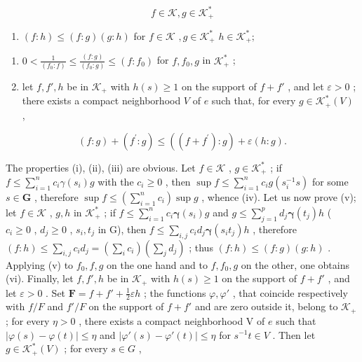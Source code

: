 \[
f \in \mathscr {K}, g \in \mathscr {K} _ {+} ^ {*}
\]

\begin{enumerate}
\def\labelenumi{(\alph{enumi})}
\setcounter{enumi}{21}
\tightlist
\item
  \((f:h)\leqslant (f:g)(g:h)\) for \(f\in \mathcal{K}\) \(,g\in \mathcal{K}_{+}^{*}\) \(h\in \mathcal{K}_{+}^{*};\)
\end{enumerate}

\begin{enumerate}
\def\labelenumi{(\roman{enumi})}
\setcounter{enumi}{5}
\item
  \(0 < \frac{1}{(f_0:f)}\leqslant \frac{(f:g)}{(f_0:g)}\leqslant (f:f_0)\) for \(f,f_0,g\) in \(\mathcal{K}_+^*\) ;
\item
  let \(f, f', h\) be in \(\mathcal{K}_+\) with \(h(s) \geqslant 1\) on the support of \(f + f'\) , and let \(\varepsilon > 0\) ; there exists a compact neighborhood \(V\) of \(e\) such that, for every \(g \in \mathcal{K}_+^*(V)\) ,
\end{enumerate}

\[
(f: g) + (f ^ {\prime}: g) \leqslant ((f + f ^ {\prime}): g) + \varepsilon (h: g).
\]

The properties (i), (ii), (iii) are obvious. Let \(f \in \mathcal{K}\) , \(g \in \mathcal{K}_+^*\) ; if \(f \leqslant \sum_{i=1}^{n} c_i \gamma(s_i)g\) with the \(c_i \geqslant 0\) , then \(\sup f \leqslant \sum_{i=1}^{n} c_i g(s_i^{-1}s)\) for some \(s \in \mathbf{G}\) , therefore \(\sup f \leqslant \left( \sum_{i=1}^{n} c_i \right) \sup g\) , whence (iv). Let us now prove (v); let \(f \in \mathcal{K}\) , \(g, h\) in \(\mathcal{K}_+^*\) ; if \(f \leqslant \sum_{i=1}^{n} c_i \boldsymbol{\gamma}(s_i) g\) and \(g \leqslant \sum_{j=1}^{p} d_j \boldsymbol{\gamma}(t_j) h\) ( \(c_i \geqslant 0\) , \(d_j \geqslant 0\) , \(s_i, t_j\) in G), then \(f \leqslant \sum_{i,j} c_i d_j \boldsymbol{\gamma}(s_i t_j) h\) , therefore \((f: h) \leqslant \sum_{i,j} c_i d_j = \left( \sum_{i} c_i \right) \left( \sum_{j} d_j \right)\) ; thus \((f: h) \leqslant (f: g)(g: h)\) . Applying (v) to \(f_0, f, g\) on the one hand and to \(f, f_0, g\) on the other, one obtains (vi). Finally, let \(f, f', h\) be in \(\mathcal{K}_+\) with \(h(s) \geqslant 1\) on the support of \(f + f'\) , and let \(\varepsilon > 0\) . Set \(\mathbf{F} = f + f' + \frac{1}{2} \varepsilon h\) ; the functions \(\varphi, \varphi'\) , that coincide respectively with \(f / F\) and \(f'/F\) on the support of \(f + f'\) and are zero outside it, belong to \(\mathcal{K}_+\) ; for every \(\eta > 0\) , there exists a compact neighborhood V of \(e\) such that \(|\varphi(s) - \varphi(t)| \leqslant \eta\) and \(|\varphi'(s) - \varphi'(t)| \leqslant \eta\) for \(s^{-1} t \in V\) . Then let \(g \in \mathcal{K}_+^*(V)\) ; for every \(s \in G\) ,


